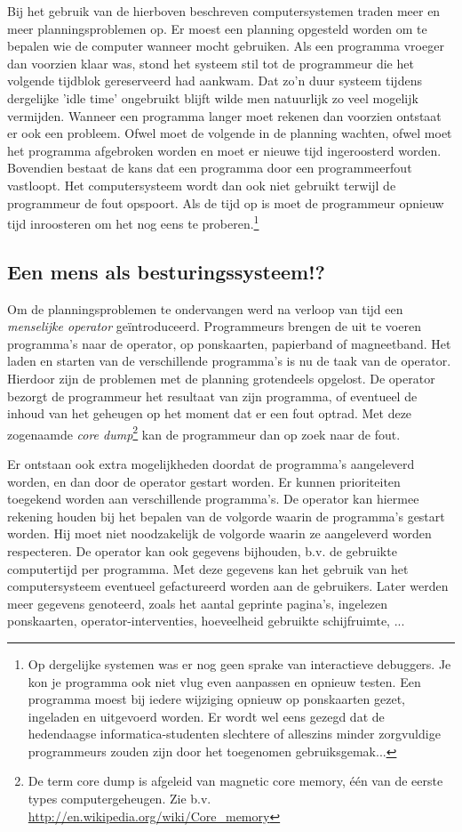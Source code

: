 Bij het gebruik van de hierboven beschreven computersystemen
traden meer en meer planningsproblemen op. Er moest een planning
opgesteld worden om te bepalen wie de computer wanneer mocht
gebruiken. Als een programma vroeger dan voorzien klaar was, stond het
systeem stil tot de programmeur die het volgende tijdblok gereserveerd
had aankwam. Dat zo'n duur systeem tijdens dergelijke 'idle time'
ongebruikt blijft wilde men natuurlijk zo veel mogelijk vermijden.
Wanneer een programma langer moet rekenen dan voorzien ontstaat er ook
een probleem. Ofwel moet de volgende in de planning wachten, ofwel
moet het programma afgebroken worden en moet er nieuwe tijd
ingeroosterd worden. Bovendien bestaat de kans dat een programma door
een programmeerfout vastloopt. Het computersysteem wordt dan ook niet
gebruikt terwijl de programmeur de fout opspoort. Als de tijd op is
moet de programmeur opnieuw tijd inroosteren om het nog eens te
proberen.\footnote{Op dergelijke systemen was er nog geen sprake van
interactieve debuggers. Je kon je programma ook niet vlug even
aanpassen en opnieuw testen. Een programma moest bij iedere
wijziging opnieuw op ponskaarten gezet, ingeladen en uitgevoerd
worden. Er wordt wel eens gezegd dat de hedendaagse
informatica-studenten slechtere of alleszins minder zorgvuldige
programmeurs zouden zijn door het toegenomen
gebruiksgemak...}

\subsection{Een mens als besturingssysteem!?}

Om de planningsproblemen te ondervangen werd na verloop van tijd
een \emph{menselijke operator} ge\"introduceerd.
Programmeurs brengen de uit te voeren programma's naar de operator, op
ponskaarten, papierband of magneetband. Het laden en starten van de
verschillende programma's is nu de taak van de operator. Hierdoor zijn
de problemen met de planning grotendeels opgelost. De operator
bezorgt de programmeur het resultaat van zijn programma, of eventueel
de inhoud van het geheugen op het moment dat er een fout optrad. Met
deze zogenaamde \emph{core dump}\footnote{De term core dump is
afgeleid van magnetic core memory, \'e\'en van de eerste types computergeheugen.
Zie b.v. \url{http://en.wikipedia.org/wiki/Core_memory}}
kan de programmeur dan op zoek naar de fout.

Er ontstaan ook extra mogelijkheden doordat de programma's
aangeleverd worden, en dan door de operator gestart worden. Er kunnen
prioriteiten toegekend worden aan verschillende programma's. De
operator kan hiermee rekening houden bij het bepalen van de volgorde
waarin de programma's gestart worden. Hij moet niet noodzakelijk de
volgorde waarin ze aangeleverd worden respecteren. De operator kan ook
gegevens bijhouden, b.v. de gebruikte computertijd per programma. Met
deze gegevens kan het gebruik van het computersysteem eventueel
gefactureerd worden aan de gebruikers. Later werden meer gegevens
genoteerd, zoals het aantal geprinte pagina's, ingelezen ponskaarten,
operator-interventies, hoeveelheid gebruikte schijfruimte, ...

